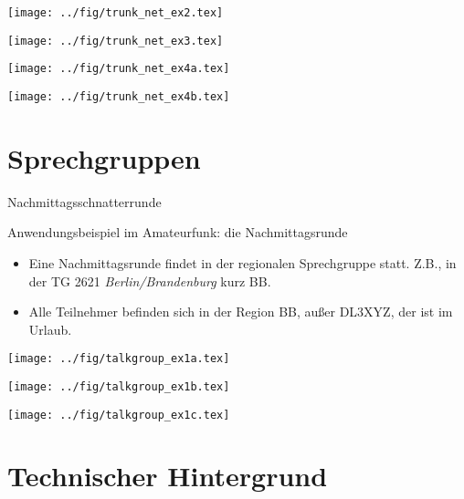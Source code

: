 \documentclass[aspectratio=169]{beamer}
\begin{document}
\begin{frame}
\centering
\texttt{[image: ../fig/trunk\_net\_ex2.tex]}
\end{frame}

\begin{frame}
\centering
\texttt{[image: ../fig/trunk\_net\_ex3.tex]}
\end{frame}

\begin{frame}
\centering
\texttt{[image: ../fig/trunk\_net\_ex4a.tex]}
\end{frame}

\begin{frame}
\centering
\texttt{[image: ../fig/trunk\_net\_ex4b.tex]}
\end{frame}

\section{Sprechgruppen}
\begin{frame}{Nachmittagsschnatterrunde}
\begin{block}{Anwendungsbeispiel im Amateurfunk: die Nachmittagsrunde}
\begin{itemize}
 \item Eine Nachmittagsrunde findet in der regionalen Sprechgruppe statt. Z.B., in der TG 2621 \emph{Berlin/Brandenburg} kurz BB.
 \item Alle Teilnehmer befinden sich in der Region BB, außer DL3XYZ, der ist im Urlaub.
\end{itemize} 
\end{block}
\end{frame}

\begin{frame}
\centering
\texttt{[image: ../fig/talkgroup\_ex1a.tex]}
\end{frame}

\begin{frame}
\centering
\texttt{[image: ../fig/talkgroup\_ex1b.tex]}
\end{frame}

\begin{frame}
\centering
\texttt{[image: ../fig/talkgroup\_ex1c.tex]}
\end{frame}


\section{Technischer Hintergrund}
\begin{frame}

\end{frame}
\end{document}
